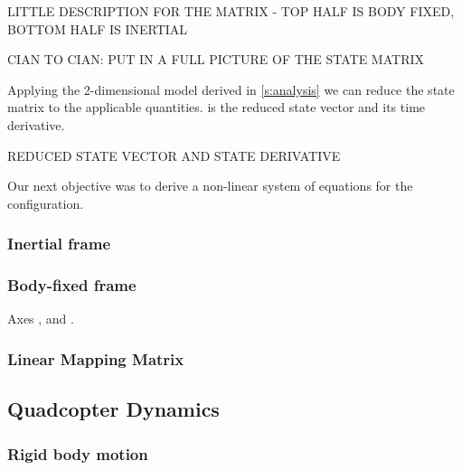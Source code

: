LITTLE DESCRIPTION FOR THE MATRIX - TOP HALF IS BODY FIXED, BOTTOM HALF IS INERTIAL

CIAN TO CIAN: PUT IN A FULL PICTURE OF THE STATE MATRIX

Applying the 2-dimensional model derived in \cref{s:analysis} we can reduce the state matrix to the applicable quantities.  is the reduced state vector and its time derivative.

REDUCED STATE VECTOR AND STATE DERIVATIVE

Our next objective was to derive a non-linear system of equations for the configuration.

\subsubsection[Inertial frame]{Inertial frame } %
\subsubsection[Body-fixed frame]{Body-fixed frame }
Axes ,  and .
\subsubsection[Linear Mapping Matrix]{Linear Mapping Matrix }
\label{sss:lmapmatQ}

\subsection{Quadcopter Dynamics}
\subsubsection{Rigid body motion}
\label{rigid-body-motion}